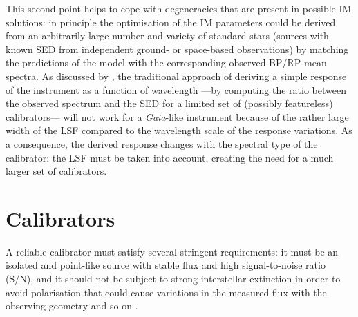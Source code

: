 \documentclass{aa}
\newcommand{\gaia}{\textit{Gaia}\xspace}
\begin{document}
This second point helps to cope with degeneracies that are present in possible IM solutions: 
in principle the optimisation of the IM parameters could be derived from an arbitrarily large number and variety of standard stars (sources with known SED from independent ground- or space-based observations) by matching the predictions of the model with the corresponding observed BP/RP mean spectra. 
As discussed by \citet{Weiler2020}, the traditional approach of deriving a simple response of the instrument as a function of wavelength ---by computing the ratio between the observed spectrum and the SED for a limited set of (possibly featureless) calibrators--- will not work for a \gaia-like instrument because of the rather large width of the LSF compared to the wavelength scale of the response variations. As a consequence, the derived response changes with the spectral type of the calibrator: the LSF must be taken into account, creating the need for a much larger set of calibrators. 

\section{Calibrators}\label{sec:calibrators}

A reliable calibrator must satisfy several stringent requirements: it must be an isolated and point-like source with stable flux and high signal-to-noise ratio (S/N), and it should not be subject to strong interstellar extinction in order to avoid polarisation that could cause variations in the measured flux with the observing geometry and so on  \citep[see][and references therein]{Pancino2012,Pancino2021}. 
\end{document}
